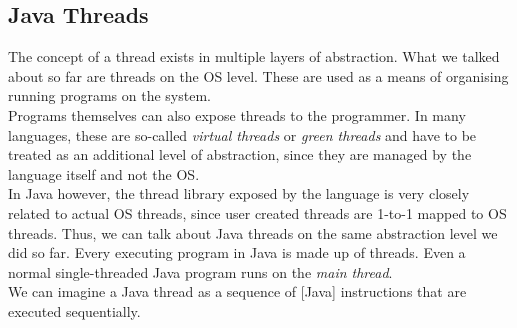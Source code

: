 \documentclass[main]{subfiles}
\begin{document}
%
%
\subsection{Java Threads}
The concept of a thread exists in multiple layers of abstraction. What we talked about so far are threads on the OS level. These are used as a means of organising running programs on the system.\\[3mm]
Programs themselves can also expose threads to the programmer. In many languages, these are so-called \textit{virtual threads} or \textit{green threads} and have to be treated as an additional level of abstraction, since they are managed by the language itself and not the OS.\\
In Java however, the thread library exposed by the language is very closely related to actual OS threads, since user created threads are 1-to-1 mapped to OS threads. Thus, we can talk about Java threads on the same abstraction level we did so far. Every executing program in Java is made up of threads. Even a normal single-threaded Java program runs on the \textit{main thread}.\\
We can imagine a Java thread as a sequence of [Java] instructions that are executed sequentially.
\end{document}
